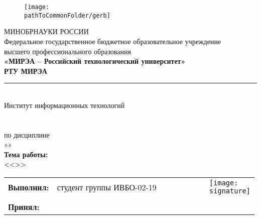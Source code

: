 
\begin{center}
	\begin{figure}[h!]
		\begin{center}
		\texttt{[image: \\pathToCommonFolder/gerb]}
		\end{center}	
	\end{figure}
 	\small	МИНОБРНАУКИ РОССИИ \\
	Федеральное государственное бюджетное образовательное учреждение\\
						высшего профессионального образования\\
\normalsize					
\textbf{«МИРЭА – Российский технологический университет»\\
						РТУ МИРЭА}\\
						\noindent\rule{1\linewidth}{1pt}\\
       Институт информационных технологий\\ %
					\kafedra\\
		\vspace{3ex}
			\large \textbf{\workname}  \\
						по дисциплине\\ «\discipline» \\
		\vspace{3ex}
		\if \withouttheme
			\textbf{Тема работы:}\\ <<\theme>>
		\fi
\vspace{3ex}
\small
\begin{table}[h!]
\begin{tabular}{p{0.14\linewidth}p{0.48\linewidth}p{0.2\linewidth}p{0.17\linewidth}}
	\textbf{Выполнил:} & студент группы ИВБО-02-19 & \studentfio &\texttt{[image: \\signature]}\\ \\
	\textbf{Принял:} & \rang & \teacherfio 
\end{tabular}
\end{table}
\end{center}

